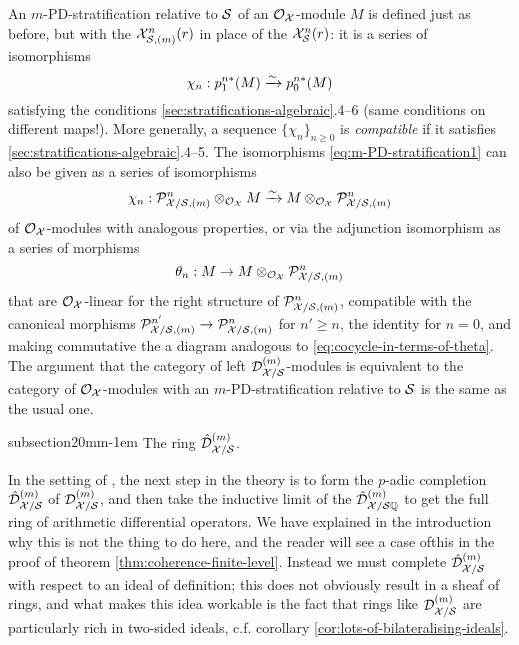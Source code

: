 \documentclass{article}
\makeatletter
\theoremstyle{change}
\renewcommand{\subsection}{\@startsection%
{subsection}{2}{0mm}{\baselineskip}{-1em}%
{\normalfont\normalsize\bfseries}}
\numberwithin{equation}{subsubsection}
\makeatother
\begin{document}
An $m$-PD-stratification relative to ${\cal S}$ of an ${\cal O}_{\cal X}$-module $M$ is
defined just as before, but with the ${\cal X}^n_{{\cal S},(m)}(r)$ in place of
the ${\cal X}^n_{{\cal S}}(r)$: it is a series of isomorphisms
\begin{equation}
  \label{eq:m-PD-stratification1}
  \chi_n:p^{n*}_1(M)\xrightarrow{\sim} p^{n*}_0(M)
\end{equation}
satisfying the conditions \ref{sec:stratifications-algebraic}.4--6
(same conditions on different maps!). More generally, a sequence
$\{\chi_n\}_{n\ge0}$ is \textit{compatible} if it satisfies
\ref{sec:stratifications-algebraic}.4--5. The isomorphisms
\ref{eq:m-PD-stratification1} can also be given as a series of
isomorphisms
\begin{equation}
  \label{eq:m-PD-stratification2}
  \chi_n:{\cal P}^n_{{\cal X}/{\cal S},(m)}\otimes_{{\cal O}_{\cal X}}M\xrightarrow{\sim}
  M\otimes_{{\cal O}_{\cal X}}{\cal P}^n_{{\cal X}/{\cal S},(m)}
\end{equation}
of ${\cal O}_{\cal X}$-modules with analogous properties, or via the adjunction
isomorphism as a series of morphisms
\begin{equation}
  \label{eq:m-PD-stratification3}
  \theta_n:M\to M\otimes_{{\cal O}_{\cal X}}{\cal P}^n_{{\cal X}/{\cal S},(m)}
\end{equation}
that are ${\cal O}_{\cal X}$-linear for the right structure of
${\cal P}^n_{{\cal X}/{\cal S},(m)}$, compatible with the canonical morphisms
${\cal P}^{n'}_{{\cal X}/{\cal S},(m)}\to{\cal P}^n_{{\cal X}/{\cal S},(m)}$ for $n'\ge n$, the
identity for $n=0$, and making commutative the a diagram analogous to
\ref{eq:cocycle-in-terms-of-theta}. The argument that the category of
left ${{\cal D}}^{({m})}_{{\cal X}/{\cal S}}$-modules is equivalent to the category of
${\cal O}_{\cal X}$-modules with an $m$-PD-stratification relative to ${\cal S}$ is
the same as the usual one.

\subsection{The ring ${\hat{\cal D}}^{({m})}_{{\cal X}/{\cal S}}$.}
\label{sec:completions}

In the setting of \cite{berthelot:1996}, the next step in the theory
is to form the $p$-adic completion ${\hat{\cal D}}^{({m})}_{{\cal X}/{\cal S}}$ of
${{\cal D}}^{({m})}_{{\cal X}/{\cal S}}$, and then take the inductive limit of the
${\hat{\cal D}}^{({m})}_{{\cal X}/{\cal S}{\mathbb Q}}$ to get the full ring of arithmetic
differential operators. We have explained in the introduction why this
is not the thing to do here, and the reader will see a case ofthis
in the proof of theorem \ref{thm:coherence-finite-level}. Instead we
must complete ${\hat{\cal D}}^{({m})}_{{\cal X}/{\cal S}}$ with respect to an ideal of
definition; this does not obviously result in a sheaf of rings, and
what makes this idea workable is the fact that rings like
${{\cal D}}^{({m})}_{{\cal X}/{\cal S}}$ are particularly rich in two-sided ideals,
c.f. corollary \ref{cor:lots-of-bilateralising-ideals}.
\end{document}
